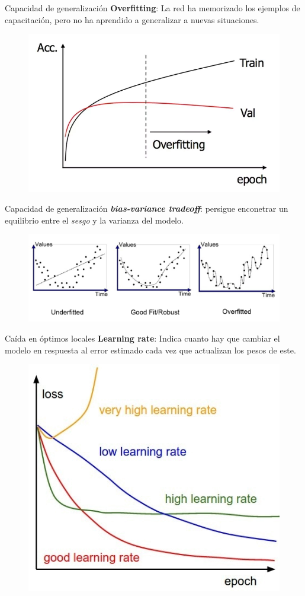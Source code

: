 \documentclass[spanish]{beamer}
\begin{document}
\begin{frame}{Capacidad de generalización}
\textbf{Overfitting}: La red ha memorizado los ejemplos de capacitación, pero no ha aprendido a generalizar a nuevas situaciones.
  \begin{figure}[h]
    \centering
    \includegraphics[width=.6\textwidth]{img/overfitting}
  \end{figure}
\end{frame}

\begin{frame}{Capacidad de generalización}
\textbf{\textit{bias-variance tradeoff}}: persigue enconetrar un equilibrio entre el \textit{sesgo} y la varianza del modelo.
  \begin{figure}[h]
    \centering
    \includegraphics[width=.6\textwidth]{img/fit}
  \end{figure}
\end{frame}

\begin{frame}{Caída en óptimos locales}
\textbf{Learning rate}: Indica cuanto hay que cambiar el modelo en respuesta al error estimado cada vez que actualizan los pesos de este.
  \begin{figure}[h]
    \centering
    \includegraphics[width=.6\textwidth]{img/learning-rate}
  \end{figure}
\end{frame}
\end{document}
